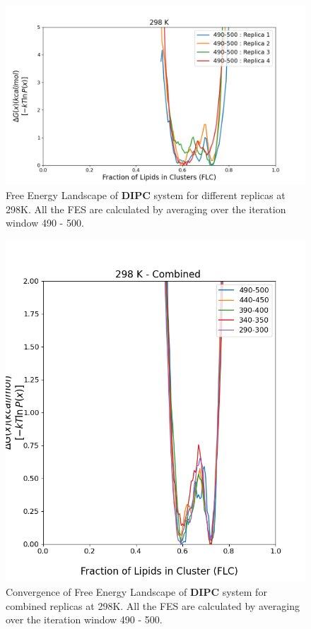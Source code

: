 \documentclass{biophys-new}
\begin{document}



\begin{figure}[hbt!]
\centering
\includegraphics[width=1.1\linewidth]{all_plots/ClusterLipids2Total/DPPC_DIPC_CHOL/298K/Average_DIPC_298_ClusterLipids2Total.png}
\caption{Free Energy Landscape of \textbf{DIPC} system for different replicas at 298K. All the FES are calculated by averaging over the iteration window 490 - 500.}
\label{fig:view}

\end{figure}

\begin{figure}[hbt!]
\centering
\includegraphics[width=0.6\linewidth]{all_plots/ClusterLipids2Total/DPPC_DIPC_CHOL/298K/Convergence_DIPC_MULTI__298_ClusterLipids2Total.png}
\caption{Convergence of Free Energy Landscape of \textbf{DIPC} system for combined replicas at 298K. All the FES are calculated by averaging over the iteration window 490 - 500.}
\label{fig:view}

\end{figure}
\end{document}
